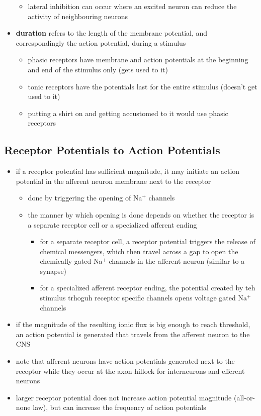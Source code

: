 \documentclass[10pt]{article}
\begin{document}
\begin{itemize}
        \begin{itemize}
            \item lateral inhibition can occur where an excited neuron can reduce the activity of neighbouring neurons
        \end{itemize}
    \item \textbf{duration} refers to the length of the membrane potential, and correspondingly the action potential, during a stimulus
        \begin{itemize}
            \item phasic receptors have membrane and action potentials at the beginning and end of the stimulus only (gets used to it)
            \item tonic receptors have the potentials last for the entire stimulus (doesn't get used to it)
            \item putting a shirt on and getting accustomed to it would use phasic receptors
        \end{itemize}
\end{itemize}

\subsection{Receptor Potentials to Action Potentials}
\begin{itemize}
    \item if a receptor potential has sufficient magnitude, it may initiate an action potential in the afferent neuron membrane next to the receptor
        \begin{itemize}
            \item done by triggering the opening of Na$^+$ channels
            \item the manner by which opening is done depends on whether the receptor is a separate receptor cell or a specialized afferent ending 
                \begin{itemize}
                    \item for a separate receptor cell, a receptor potential triggers the release of chemical messengers, which then travel across a gap to open the chemically gated Na$^+$ channels in the afferent neuron (similar to a synapse)
                    \item for a specialized afferent receptor ending, the potential created by teh stimulus trhoguh receptor specific channels opens voltage gated Na$^+$ channels
                \end{itemize}
        \end{itemize}
    \item if the magnitude of the resulting ionic flux is big enough to reach threshold, an action potential is generated that travels from the afferent neuron to the CNS
    \item note that afferent neurons have action potentials generated next to the receptor while they occur at the axon hillock for interneurons and efferent neurons 
    \item larger receptor potential does not increase action potential magnitude (all-or-none law), but can increase the frequency of action potentials
\end{itemize}
\end{document}
